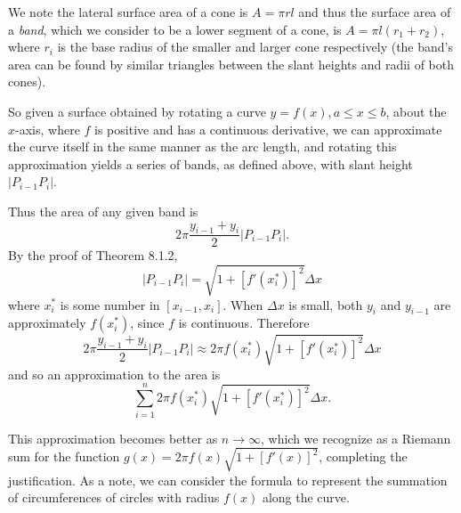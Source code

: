 \documentclass[a4paper,11pt]{article}
\begin{document}
\begin{outline}
    \pagebreak
    \begin{justification}
      We note the lateral surface area of a cone is \(A = \pi rl\) and thus the surface area of a \textit{band}, which
      we consider to be a lower segment of a cone, is \(A = \pi l(r_1+r_2)\), where \(r_i\) is the base radius of the
      smaller and larger cone respectively (the band's area can be found by similar triangles between the slant heights
      and radii of both cones).
      
      So given a surface obtained by rotating a curve \(y=f(x), a\leq x \leq b\), about the \(x\)-axis, where 
      \(f\) is positive and has a continuous derivative, we can approximate the curve itself in the same manner 
      as the arc length, and rotating this approximation yields a series of bands, as defined above, with slant 
      height \(|P_{i-1}P_i|\).
      
      Thus the area of any given band is \[2\pi\frac{y_{i-1}+y_i}{2}|P_{i-1}P_i|\text{.}\] By the proof of Theorem 8.1.2,
      \[ |P_{i-1}P_i| = \sqrt{1+[f'(x_i^*)]^2}\Delta{x} \] where \(x_i^*\) is some number in \([x_{i-1},x_i]\). When
      \(\Delta{x}\) is small, both \(y_i\) and \(y_{i-1}\) are approximately \(f(x_i^*)\), since \(f\) is continuous.
      Therefore \[2\pi\frac{y_{i-1}+y_i}{2}|P_{i-1}P_i| \approx 2\pi f(x_i^*)\sqrt{1+[f'(x_i^*)]^2}\Delta{x}\]
      and so an approximation to the area is \[ \sum_{i=1}^n2\pi f(x_i^*)\sqrt{1+[f'(x_i^*)]^2}\Delta{x}\text{.} \]
      
      This approximation becomes better as \(n\rightarrow\infty\), which we recognize as a Riemann sum for the
      function \(g(x) = 2\pi f(x)\sqrt{1+[f'(x)]^2}\), completing the justification. As a note, we can consider
      the formula to represent the summation of circumferences of circles with radius \(f(x)\) along the curve.
    \end{justification}

\end{outline}
\end{document}
